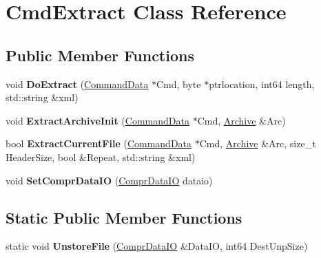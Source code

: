 \hypertarget{class_cmd_extract}{\section{Cmd\-Extract Class Reference}
\label{class_cmd_extract}
}
\subsection*{Public Member Functions}
\begin{DoxyCompactItemize}
\item 
\hypertarget{class_cmd_extract_a7d159412140281287271694ba881d596}{void {\bfseries Do\-Extract} (\hyperlink{class_command_data}{Command\-Data} $\ast$Cmd, byte $\ast$ptrlocation, int64 length, std\-::string \&xml)}\label{class_cmd_extract_a7d159412140281287271694ba881d596}

\item 
\hypertarget{class_cmd_extract_a85bd068da65d48061a194ddadeabd362}{void {\bfseries Extract\-Archive\-Init} (\hyperlink{class_command_data}{Command\-Data} $\ast$Cmd, \hyperlink{class_archive}{Archive} \&Arc)}\label{class_cmd_extract_a85bd068da65d48061a194ddadeabd362}

\item 
\hypertarget{class_cmd_extract_a1cd4ef7fdd2a73302dd65a5c4aa0b774}{bool {\bfseries Extract\-Current\-File} (\hyperlink{class_command_data}{Command\-Data} $\ast$Cmd, \hyperlink{class_archive}{Archive} \&Arc, size\-\_\-t Header\-Size, bool \&Repeat, std\-::string \&xml)}\label{class_cmd_extract_a1cd4ef7fdd2a73302dd65a5c4aa0b774}

\item 
\hypertarget{class_cmd_extract_a283db4b2aff0607b9a622f3b7343be9b}{void {\bfseries Set\-Compr\-Data\-I\-O} (\hyperlink{class_compr_data_i_o}{Compr\-Data\-I\-O} dataio)}\label{class_cmd_extract_a283db4b2aff0607b9a622f3b7343be9b}

\end{DoxyCompactItemize}
\subsection*{Static Public Member Functions}
\begin{DoxyCompactItemize}
\item 
\hypertarget{class_cmd_extract_a5433c944c5958cf99ff205e5903e3da6}{static void {\bfseries Unstore\-File} (\hyperlink{class_compr_data_i_o}{Compr\-Data\-I\-O} \&Data\-I\-O, int64 Dest\-Unp\-Size)}\label{class_cmd_extract_a5433c944c5958cf99ff205e5903e3da6}

\end{DoxyCompactItemize}

